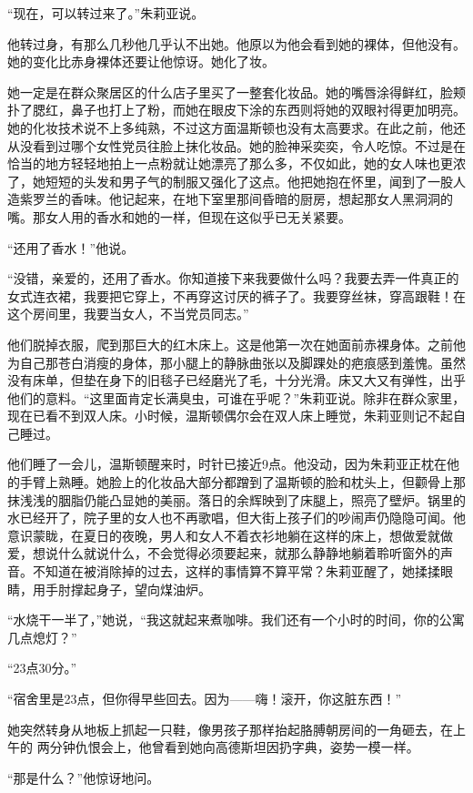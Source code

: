 ``现在，可以转过来了。''朱莉亚说。

他转过身，有那么几秒他几乎认不出她。他原以为他会看到她的裸体，但他没有。她的变化比赤身裸体还要让他惊讶。她化了妆。

她一定是在群众聚居区的什么店子里买了一整套化妆品。她的嘴唇涂得鲜红，脸颊扑了腮红，鼻子也打上了粉，而她在眼皮下涂的东西则将她的双眼衬得更加明亮。她的化妆技术说不上多纯熟，不过这方面温斯顿也没有太高要求。在此之前，他还从没看到过哪个女性党员往脸上抹化妆品。她的脸神采奕奕，令人吃惊。不过是在恰当的地方轻轻地拍上一点粉就让她漂亮了那么多，不仅如此，她的女人味也更浓了，她短短的头发和男子气的制服又强化了这点。他把她抱在怀里，闻到了一股人造紫罗兰的香味。他记起来，在地下室里那间昏暗的厨房，想起那女人黑洞洞的嘴。那女人用的香水和她的一样，但现在这似乎已无关紧要。

``还用了香水！''他说。

``没错，亲爱的，还用了香水。你知道接下来我要做什么吗？我要去弄一件真正的女式连衣裙，我要把它穿上，不再穿这讨厌的裤子了。我要穿丝袜，穿高跟鞋！在这个房间里，我要当女人，不当党员同志。''

他们脱掉衣服，爬到那巨大的红木床上。这是他第一次在她面前赤裸身体。之前他为自己那苍白消瘦的身体，那小腿上的静脉曲张以及脚踝处的疤痕感到羞愧。虽然没有床单，但垫在身下的旧毯子已经磨光了毛，十分光滑。床又大又有弹性，出乎他们的意料。``这里面肯定长满臭虫，可谁在乎呢？''朱莉亚说。除非在群众家里，现在已看不到双人床。小时候，温斯顿偶尔会在双人床上睡觉，朱莉亚则记不起自己睡过。

他们睡了一会儿，温斯顿醒来时，时针已接近9点。他没动，因为朱莉亚正枕在他的手臂上熟睡。她脸上的化妆品大部分都蹭到了温斯顿的脸和枕头上，但颧骨上那抹浅浅的胭脂仍能凸显她的美丽。落日的余辉映到了床腿上，照亮了壁炉。锅里的水已经开了，院子里的女人也不再歌唱，但大街上孩子们的吵闹声仍隐隐可闻。他意识蒙眬，在夏日的夜晚，男人和女人不着衣衫地躺在这样的床上，想做爱就做爱，想说什么就说什么，不会觉得必须要起来，就那么静静地躺着聆听窗外的声音。不知道在被消除掉的过去，这样的事情算不算平常？朱莉亚醒了，她揉揉眼睛，用手肘撑起身子，望向煤油炉。

``水烧干一半了，''她说，``我这就起来煮咖啡。我们还有一个小时的时间，你的公寓几点熄灯？''

``23点30分。''

``宿舍里是23点，但你得早些回去。因为——嗨！滚开，你这脏东西！''

她突然转身从地板上抓起一只鞋，像男孩子那样抬起胳膊朝房间的一角砸去，在上午的
两分钟仇恨会上，他曾看到她向高德斯坦因扔字典，姿势一模一样。

``那是什么？''他惊讶地问。

